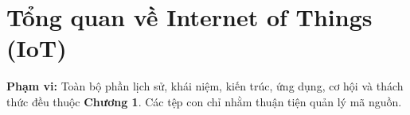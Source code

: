 \chapter{Tổng quan về Internet of Things (IoT)}
\label{chap:overview}
\begin{notebox}
\textbf{Phạm vi:} Toàn bộ phần lịch sử, khái niệm, kiến trúc,
ứng dụng, cơ hội và thách thức đều thuộc \textbf{Chương 1}.
Các tệp con chỉ nhằm thuận tiện quản lý mã nguồn.
\end{notebox}



